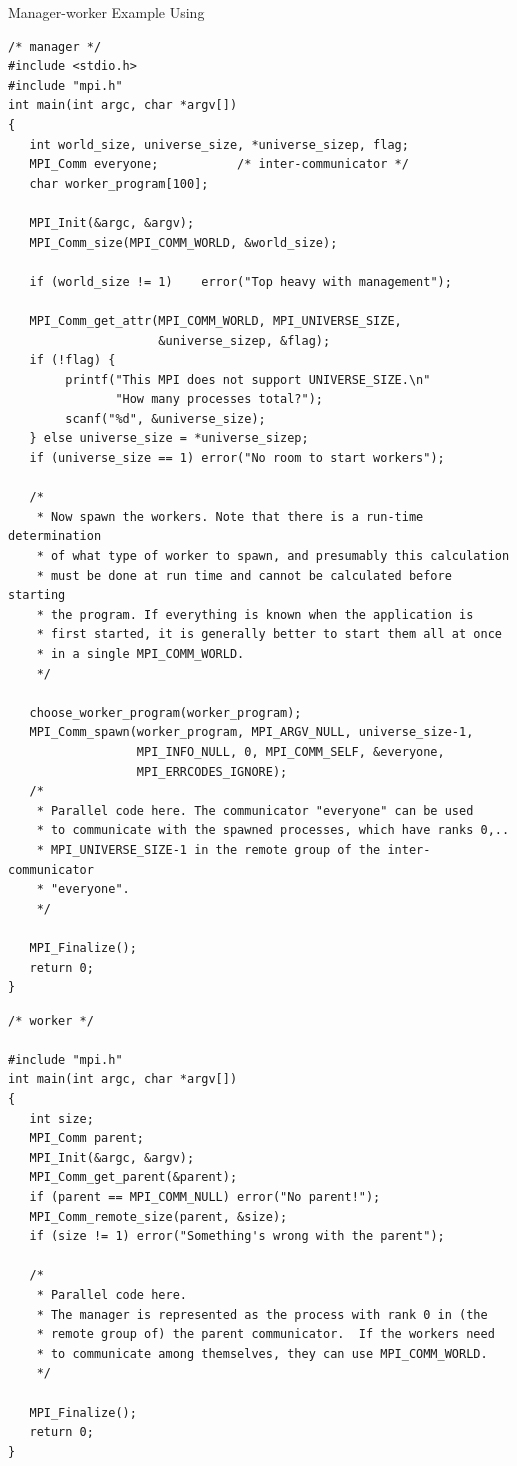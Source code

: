\begin{example}
%
Manager-worker Example Using \texorpdfstring{}{MPI\_COMM\_SPAWN}


\begin{lstlisting}[language={[MPI]C}]
/* manager */
#include <stdio.h>
#include "mpi.h"
int main(int argc, char *argv[])
{
   int world_size, universe_size, *universe_sizep, flag;
   MPI_Comm everyone;           /* inter-communicator */
   char worker_program[100];

   MPI_Init(&argc, &argv);
   MPI_Comm_size(MPI_COMM_WORLD, &world_size);

   if (world_size != 1)    error("Top heavy with management");

   MPI_Comm_get_attr(MPI_COMM_WORLD, MPI_UNIVERSE_SIZE,
                     &universe_sizep, &flag);
   if (!flag) {
        printf("This MPI does not support UNIVERSE_SIZE.\n"
               "How many processes total?");
        scanf("%d", &universe_size);
   } else universe_size = *universe_sizep;
   if (universe_size == 1) error("No room to start workers");

   /*
    * Now spawn the workers. Note that there is a run-time determination
    * of what type of worker to spawn, and presumably this calculation
    * must be done at run time and cannot be calculated before starting
    * the program. If everything is known when the application is
    * first started, it is generally better to start them all at once
    * in a single MPI_COMM_WORLD.
    */

   choose_worker_program(worker_program);
   MPI_Comm_spawn(worker_program, MPI_ARGV_NULL, universe_size-1,
                  MPI_INFO_NULL, 0, MPI_COMM_SELF, &everyone,
                  MPI_ERRCODES_IGNORE);
   /*
    * Parallel code here. The communicator "everyone" can be used
    * to communicate with the spawned processes, which have ranks 0,..
    * MPI_UNIVERSE_SIZE-1 in the remote group of the inter-communicator
    * "everyone".
    */

   MPI_Finalize();
   return 0;
}
\end{lstlisting}
\begin{lstlisting}[language={[MPI]C}]
/* worker */

#include "mpi.h"
int main(int argc, char *argv[])
{
   int size;
   MPI_Comm parent;
   MPI_Init(&argc, &argv);
   MPI_Comm_get_parent(&parent);
   if (parent == MPI_COMM_NULL) error("No parent!");
   MPI_Comm_remote_size(parent, &size);
   if (size != 1) error("Something's wrong with the parent");

   /*
    * Parallel code here.
    * The manager is represented as the process with rank 0 in (the
    * remote group of) the parent communicator.  If the workers need
    * to communicate among themselves, they can use MPI_COMM_WORLD.
    */

   MPI_Finalize();
   return 0;
}
\end{lstlisting}
\end{example}


